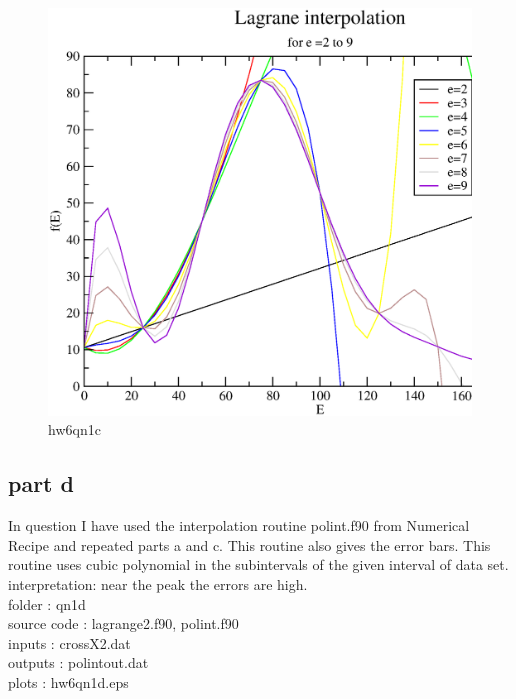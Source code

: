 \documentclass[11pt,a4paper,english]{article}
\begin{document}
	\begin{figure}[h!]
	\centering
	\includegraphics [scale=0.6]{hw6qn1c.eps}
	\caption{hw6qn1c }
	\end{figure}
	\clearpage

	
	\subsection{part d}
In question I have used the interpolation routine polint.f90 from
Numerical Recipe and repeated parts a and c. This routine also gives the error bars. This routine uses cubic polynomial in the subintervals of the given interval of data set.\\
interpretation: near the peak the errors are high.\\
    folder       : qn1d\\
	source code  : lagrange2.f90, polint.f90\\
	inputs       : crossX2.dat\\
	outputs      : polintout.dat\\
	plots        : hw6qn1d.eps\\
	
\end{document}
